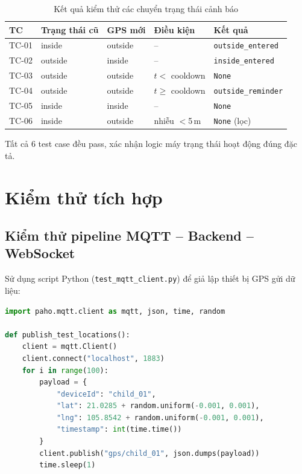 \begin{table}[H]
\centering
\caption{Kết quả kiểm thử các chuyển trạng thái cảnh báo}
\label{tab:alert_state_test}
\begin{tabularx}{\textwidth}{l l l X l}
\toprule
\textbf{TC} & \textbf{Trạng thái cũ} & \textbf{GPS mới} & \textbf{Điều kiện} & \textbf{Kết quả} \\
\midrule
TC-01 & inside  & outside & --              & \texttt{outside\_entered} \\
TC-02 & outside & inside  & --              & \texttt{inside\_entered} \\
TC-03 & outside & outside & $t <$ cooldown  & \texttt{None} \\
TC-04 & outside & outside & $t \geq$ cooldown & \texttt{outside\_reminder} \\
TC-05 & inside  & inside  & --              & \texttt{None} \\
TC-06 & inside  & outside & nhiễu $<$5\,m   & \texttt{None} (lọc) \\
\bottomrule
\end{tabularx}
\end{table}

Tất cả 6 test case đều pass, xác nhận logic máy trạng thái hoạt động đúng đặc tả.

\section{Kiểm thử tích hợp}

\subsection{Kiểm thử pipeline MQTT -- Backend -- WebSocket}

Sử dụng script Python (\texttt{test\_mqtt\_client.py}) để giả lập thiết bị GPS gửi dữ liệu:

\begin{lstlisting}[language=python, caption=Script giả lập thiết bị GPS]
import paho.mqtt.client as mqtt, json, time, random

def publish_test_locations():
    client = mqtt.Client()
    client.connect("localhost", 1883)
    for i in range(100):
        payload = {
            "deviceId": "child_01",
            "lat": 21.0285 + random.uniform(-0.001, 0.001),
            "lng": 105.8542 + random.uniform(-0.001, 0.001),
            "timestamp": int(time.time())
        }
        client.publish("gps/child_01", json.dumps(payload))
        time.sleep(1)
\end{lstlisting}

